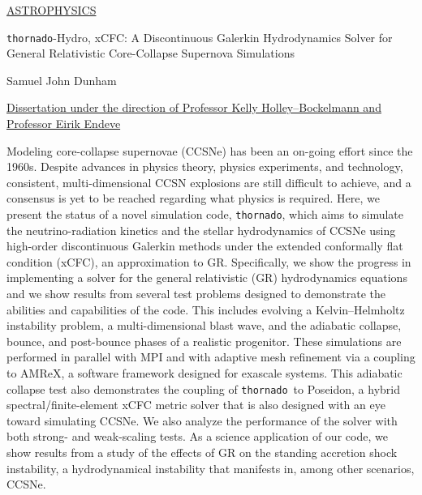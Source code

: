 \documentclass[10pt]{article}
\newcommand{\thornado}{\texttt{thornado}}
\begin{document}

\begin{flushright}
\underline{ASTROPHYSICS}
\end{flushright}\vspace{1em}

\flushleft

\begin{center}
\thornado-Hydro, xCFC: A Discontinuous Galerkin Hydrodynamics
Solver for General Relativistic
Core-Collapse Supernova Simulations
\end{center}\vspace{1em}

\begin{center}
Samuel John Dunham
\end{center}\vspace{1em}

\centerline{\underline{Dissertation under the direction of
Professor Kelly Holley--Bockelmann and Professor Eirik Endeve}}
\vspace{1em}

\begin{doublespace}

Modeling core-collapse supernovae (CCSNe) has been an on-going effort
since the 1960s.
Despite advances in physics theory, physics experiments, and technology,
consistent, multi-dimensional CCSN explosions are still difficult to achieve,
and a consensus is yet to be reached regarding what physics is required.
Here, we present the status of a novel simulation code, \thornado,
which aims to simulate the neutrino-radiation kinetics
and the stellar hydrodynamics of
CCSNe using high-order discontinuous Galerkin methods
under the extended conformally flat condition (xCFC), an approximation to GR.
Specifically, we show the progress in implementing a
solver for the general relativistic (GR)
hydrodynamics equations and we show results from several test problems
designed to demonstrate the abilities and capabilities of the code.
This includes evolving a Kelvin--Helmholtz instability problem,
a multi-dimensional blast wave, and
the adiabatic collapse, bounce, and post-bounce phases
of a realistic progenitor.
These simulations are performed
in parallel with MPI and with adaptive mesh refinement via a coupling
to AMReX, a software framework designed for exascale systems.
This adiabatic collapse test also demonstrates the coupling of \thornado\ to
Poseidon, a hybrid spectral/finite-element xCFC metric solver
that is also designed
with an eye toward simulating CCSNe.
We also analyze the performance of the solver with both
strong- and weak-scaling tests.
As a science application of our code,
we show results from a study of the effects of GR on the
standing accretion shock instability, a hydrodynamical instability
that manifests in, among other scenarios, CCSNe.

\end{doublespace}
\vspace{2em}
\end{document}
